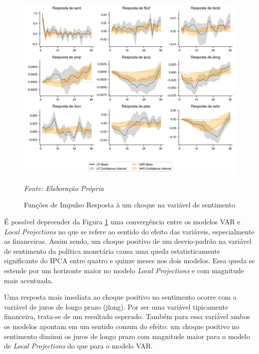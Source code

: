 \begin{figure}[H]
    \captionsetup{position=above} %
    \caption{Funções de Impulso Resposta à um choque na variável de sentimento}
    \centering
    \includegraphics[width=\textwidth]{imagens/lp_var_comparison.png} %
    \label{graf:lp_var_comparison}
    \par\noindent
    \begin{minipage}{\textwidth}
        \centering
        \footnotesize %
        \textit{Fonte: Elaboração Própria}
    \end{minipage}
\end{figure}

É possível depreender da Figura \ref{graf:lp_var_comparison} uma convergência entre os modelos VAR e \textit{Local Projections} no que se refere ao sentido do efeito das variáveis, especialmente as financeiras. Assim sendo, um choque positivo de um desvio-padrão na variável de sentimento da política monetária causa uma queda estatisticamente significante do IPCA entre quatro e quinze meses nos dois modelos. Essa queda se estende por um horizonte maior no modelo \textit{Local Projections} e com magnitude mais acentuada.

Uma resposta mais imediata ao choque positivo no sentimento ocorre com a variável de juros de longo prazo (jlong). Por ser uma variável tipicamente financeira, trata-se de um resultado esperado. Também para essa variável ambos os modelos apontam em um sentido comum do efeito: um choque positivo no sentimento diminui os juros de longo prazo com magnitude maior para o modelo de \textit{Local Projections} do que para o modelo VAR.

